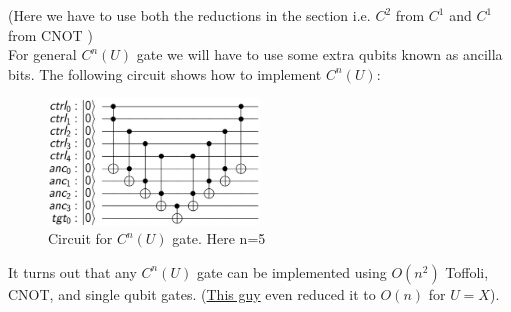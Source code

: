 \newline
{\centering (Here we have to use both the reductions in the section i.e. $C^2$ from $C^1$ and $C^1$ from {\scshape CNOT} )}\\
For general $C^n(U)$ gate we will have to use some extra qubits known as ancilla bits. The following circuit shows how to implement $C^n(U)$:
\begin{figure}[h]
\centering
\includegraphics[width=0.5\textwidth]{images/cn.png}\par
\label{cn}
\caption{Circuit for $C^n(U)$ gate. Here n=5}
\end{figure}
\newline
It turns out that any $C^n(U)$ gate can be implemented using $O(n^2)$ Toffoli, {\scshape CNOT}, and single qubit gates.
(\href{https://algassert.com/circuits/2015/06/05/Constructing-Large-Controlled-Nots.html}{This guy} even reduced it to $O(n)$ for $U=X$).